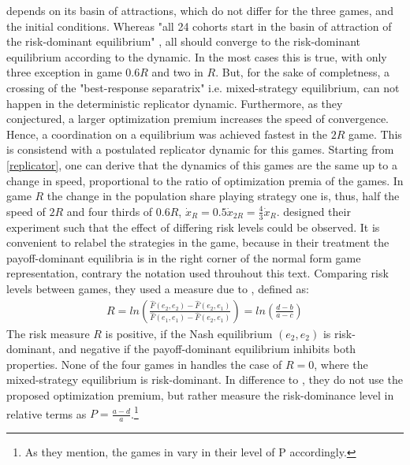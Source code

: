 \documentclass[12pt]{article}
\begin{document}
depends on its basin of attractions, which do not differ for the three games, 
and the initial conditions. Whereas "all 24 cohorts start in the basin of attraction
of the risk-dominant equilibrium" \parencite{battalio_optimization_2001}, 
all should converge to the risk-dominant equilibrium according to the dynamic.
In the most cases this is true, with only three exception in game $0.6R$ 
and two in $R$.
But, for the sake of completness, a crossing of the  
"best-response separatrix" \parencite{battalio_optimization_2001} i.e. 
mixed-strategy equilibrium, can not happen in the deterministic replicator 
dynamic.
Furthermore, as they conjectured, a larger
optimization premium increases the speed of convergence. Hence, a coordination
on a equilibrium was achieved fastest in the $2R$ game. 
This is consistend with a postulated replicator dynamic for this games. 
Starting from \ref{replicator}, one can derive that the dynamics of this games
are the same up to a change in speed, proportional to the ratio of 
optimization premia of the games. In game $R$ the change in the population share
playing strategy one is, thus, half the speed of $2R$ and four thirds of $0.6R$,
$\dot{x}_{R} = 0.5 \dot{x}_{2R} = \frac{4}{3}\dot{x}_R$.
\textcite{schmidt_playing_2003} designed their experiment such that the effect
of differing risk levels could be observed. It is convenient to relabel 
the strategies in the game, because in their treatment the payoff-dominant 
equilibria is in the right corner of the normal form game representation,
contrary the notation used throuhout this text. Comparing risk levels between
games, they used a measure due to \cite{Seltenanaxiomaticriskmeasure}, defined
as:
\begin{align}
        \label{riskmeasureschmidt}
        R = ln\left(\frac{\hat{F}(e_2,e_2) -\hat{F}(e_2,e_1)}{\hat{F}(e_1,e_1) 
        -\hat{F}(e_2,e_1)}\right) = ln \left(\frac{d-b}{a-c}\right)
\end{align}
The risk measure $R$ is positive, if the Nash equilibrium $(e_2,e_2)$ is
risk-dominant, and negative if the payoff-dominant equilibrium inhibits both
properties.
None of the four games in \textcite{schmidt_playing_2003} handles
the case of $R=0$, where the mixed-strategy equilibrium is risk-dominant.
In difference to \textcite{battalio_optimization_2001}, they do not
use the proposed optimization premium, but rather measure the risk-dominance 
level in relative terms as $P=\frac{a-d}{a}$.\footnote{As they mention, the 
games in \textcite{battalio_optimization_2001} vary in their level of 
P accordingly.}
\end{document}
